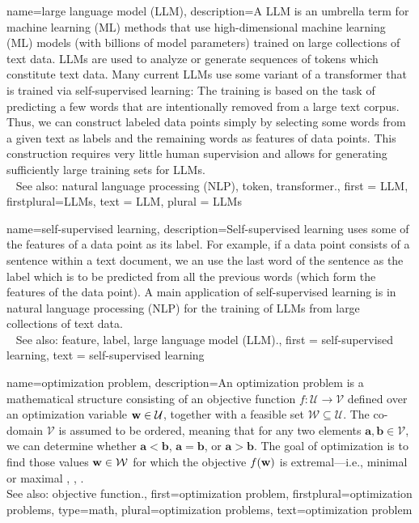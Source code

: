 {
{name={large language model (LLM)},
 description={A LLM is an umbrella term for machine learning (ML) 
               methods that use high-dimensional machine learning (ML) models (with billions 
			   of model parameters) trained on large collections of text data. 
 			  LLMs are used to analyze or generate sequences of tokens which 
               constitute text data. Many current LLMs use some variant of 
			   a transformer that is trained via self-supervised learning:  
			   The training is based on the task of predicting a few words that 
			   are intentionally removed from a large text corpus. Thus, we can 
			   construct labeled data points simply by selecting some words 
			   from a given text as labels and the remaining words as features 
			   of data points. This construction requires 
		       very little human supervision and allows for generating sufficiently 
		       large training sets for LLMs.\\ 
			   See also: natural language processing (NLP), token, transformer.}, 
  first = {LLM}, 
  firstplural={LLMs}, 
  text = {LLM}, 
  plural = {LLMs} 
}


 {name={self-supervised learning},
  description={Self-supervised learning  uses some of 
  			   the features of a data point as its label. For 
			   example, if a data point consists of a sentence within a text document, 
			   we an use the last word of the sentence as the label which is 
			   to be predicted from all the previous words (which form the features 
			   of the data point). A main application of self-supervised learning 
			   is in natural language processing (NLP) for the training of LLMs from large collections 
			   of text data. \\ 
      See also: feature, label, large language model (LLM).}, 
   first = {self-supervised learning}, 
   text = {self-supervised learning}
}




{name={optimization problem}, 
	description={An optimization problem is a mathematical 
		   structure consisting of an objective function $f: \mathcal{U} \rightarrow \mathcal{V}$ 
		   defined over an optimization variable ${\bf w} \in \mathcal{U}$, together with a 
		   feasible set $\mathcal{W} \subseteq \mathcal{U}$. The co-domain $\mathcal{V}$ is 
		   assumed to be ordered, meaning that for any two elements $\mathbf{a}, \mathbf{b} \in \mathcal{V}$, 
		   we can determine whether $\mathbf{a} < \mathbf{b}$, $\mathbf{a} = \mathbf{b}$, 
		   or $\mathbf{a} > \mathbf{b}$. The goal of optimization is to find those values ${\bf w} \in \mathcal{W}$ 
		   for which the objective $f({\bf w})$ is extremal—i.e., minimal or maximal \cite{BoydConvexBook}, \cite{BertsekasNonLinProgr}, \cite{nesterov04}.
		   \\
		   See also: objective function.},
	first={optimization problem},
	firstplural={optimization problems}, 
	type=math,
	plural={optimization problems}, 
	text={optimization problem}
}

}
